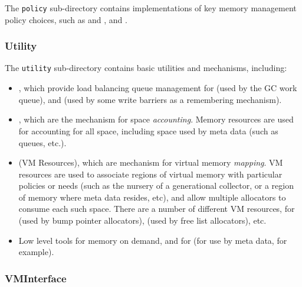 The \texttt{policy} sub-directory contains implementations of key
memory management policy choices, such as  and ,  and .

\subsubsection{Utility} \label{sssec:utility}

The \texttt{utility} sub-directory contains basic utilities and
mechanisms, including:
\begin{itemize}
\item {}, which provide load balancing queue
  management for  (used by
  the GC work queue), and  (used by some write barriers as a
  remembering mechanism).
\item {}, which are the
  mechanism for space \emph{accounting}.  Memory resources are used
  for accounting for all space, including space used by meta data
  (such as queues, etc.).
\item {} (VM
  Resources), which are mechanism for virtual memory \emph{mapping}.
  VM resources are used to associate regions of virtual memory with
  particular policies or needs (such as the nursery of a generational
  collector, or a region of memory where meta data resides, etc), and
  allow multiple allocators to consume each such space. There are a
  number of different VM resources, for  (used by bump pointer
  allocators), 
  (used by free list allocators), etc.
\item Low level tools for 
  memory on demand, and for  (for use by meta data, for example).
\end{itemize}

\subsubsection{VMInterface} \label{sssec:vminterface}

